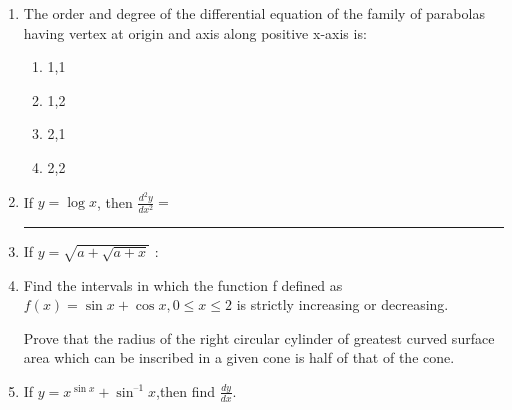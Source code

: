 \begin{enumerate}[label=\thesection.\arabic*.,ref=\thesection.\theenumi]

\item The order and degree of the differential equation of the family of parabolas having vertex at origin and axis along positive x-axis is:


\begin{enumerate}
\item 1,1
\item 1,2
\item 2,1
\item 2,2
\end{enumerate}

\item If $y = \log x$, then $\frac{d^2y}{dx^2}=$ \rule{30pt}{1pt}

\item If $y=\sqrt{a+\sqrt{a+x}}$ :

\item Find the intervals in which the function f defined as $f(x) = \sin x + \cos x, 0\le x \le 2$ is strictly increasing or decreasing.

Prove that the radius of the right circular cylinder of greatest curved surface area which can be inscribed in a given cone is half of that of the cone.
\item If $y=x^{\sin x}+\sin^{–1}x$,then find $\frac{dy}{dx}$.
\end{enumerate}

